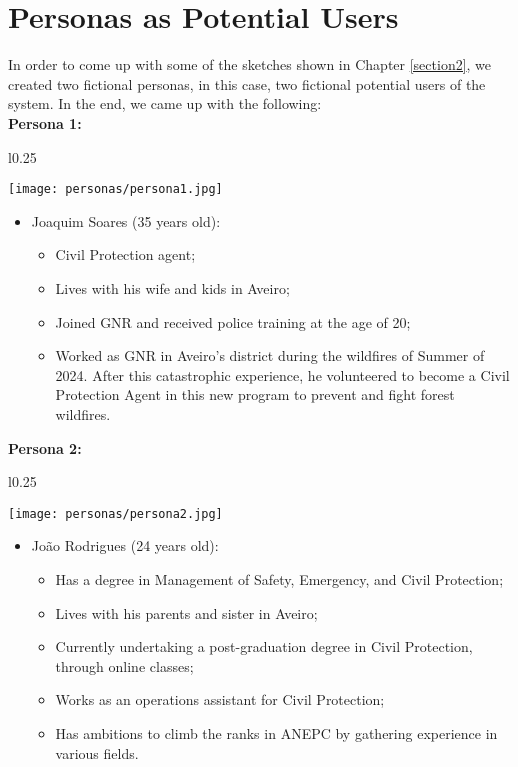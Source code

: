 \section{Personas as Potential Users}
In order to come up with some of the sketches shown in Chapter \ref{section2},
we created two fictional personas, in this case, two 
fictional potential users of the system. In the end, we came up 
with the following:
 \\

\textbf{Persona 1:} \\
\begin{wrapfigure}{l}{0.25\textwidth}
    \begin{center}
    \texttt{[image: personas/persona1.jpg]}
    \end{center}
\end{wrapfigure}
\begin{itemize}
    \item Joaquim Soares (35 years old):
    \begin{itemize}
    \item Civil Protection agent;
    \item Lives with his wife and kids in Aveiro;
    \item Joined GNR and received police training at the age of 20;
    \item Worked as GNR in Aveiro's district during the wildfires of 
    Summer of 2024. 
    After this catastrophic experience, he volunteered to become a
    Civil Protection Agent in this new program to prevent and fight forest wildfires. \\
    \end{itemize}
\end{itemize} 

\textbf{Persona 2:} \\
\begin{wrapfigure}{l}{0.25\textwidth}
    \begin{center}
    \texttt{[image: personas/persona2.jpg]}
    \end{center}
\end{wrapfigure}
\begin{itemize}
    \item João Rodrigues (24 years old):
    \begin{itemize}
    \item Has a degree in Management of
    Safety, Emergency, and Civil Protection;
    \item Lives with his parents and sister in Aveiro;
    \item Currently undertaking a post-graduation degree in Civil Protection,
    through online classes;
    \item Works as an operations assistant for Civil Protection; 
    \item Has ambitions to
    climb the ranks in ANEPC by gathering experience in various fields.
    \end{itemize}
\end{itemize}
